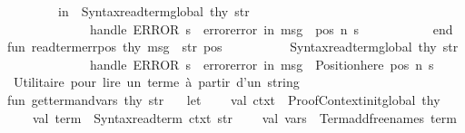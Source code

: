\begin{isabellebody}
\ \ \ \ \ \ \ \ in\ \ {\isacharparenleft}{\kern0pt}Syntax{\isachardot}{\kern0pt}read{\isacharunderscore}{\kern0pt}term{\isacharunderscore}{\kern0pt}global\ thy\ str\isanewline
\ \ \ \ \ \ \ \ \ \ \ \ \ handle\ ERROR\ s\ {\isacharequal}{\kern0pt}{\isachargreater}{\kern0pt}\ error{\isacharparenleft}{\kern0pt}{\isachardoublequote}{\kern0pt}error\ in\ {\isachardoublequote}{\kern0pt}{\isacharcircum}{\kern0pt}msg{\isacharcircum}{\kern0pt}{\isachardoublequote}{\kern0pt}\ {\isacharcolon}{\kern0pt}{\isachardoublequote}{\kern0pt}{\isacharcircum}{\kern0pt}\ pos\ {\isacharcircum}{\kern0pt}{\isachardoublequote}{\kern0pt}{\isacharbackslash}{\kern0pt}n{\isachardoublequote}{\kern0pt}{\isacharcircum}{\kern0pt}\ s\ {\isacharparenright}{\kern0pt}\ {\isacharparenright}{\kern0pt}\ \isanewline
\ \ \ \ \ \ \ \ end\isanewline
\isanewline
fun\ read{\isacharunderscore}{\kern0pt}term{\isacharunderscore}{\kern0pt}err{\isacharunderscore}{\kern0pt}pos\ thy\ msg\ {\isacharunderscore}{\kern0pt}\ str\ pos\ {\isacharequal}{\kern0pt}\ \isanewline
\ \ \ \ \ \ \ \ {\isacharparenleft}{\kern0pt}Syntax{\isachardot}{\kern0pt}read{\isacharunderscore}{\kern0pt}term{\isacharunderscore}{\kern0pt}global\ thy\ str\isanewline
\ \ \ \ \ \ \ \ \ \ \ \ \ handle\ ERROR\ s\ {\isacharequal}{\kern0pt}{\isachargreater}{\kern0pt}\ error{\isacharparenleft}{\kern0pt}{\isachardoublequote}{\kern0pt}error\ in\ {\isachardoublequote}{\kern0pt}{\isacharcircum}{\kern0pt}msg{\isacharcircum}{\kern0pt}{\isachardoublequote}{\kern0pt}\ {\isacharcolon}{\kern0pt}{\isachardoublequote}{\kern0pt}{\isacharcircum}{\kern0pt}\ {\isacharparenleft}{\kern0pt}Position{\isachardot}{\kern0pt}here\ pos{\isacharparenright}{\kern0pt}\ {\isacharcircum}{\kern0pt}{\isachardoublequote}{\kern0pt}{\isacharbackslash}{\kern0pt}n{\isachardoublequote}{\kern0pt}{\isacharcircum}{\kern0pt}\ s\ {\isacharparenright}{\kern0pt}\ {\isacharparenright}{\kern0pt}\ \isanewline
\isanewline
{\isacharparenleft}{\kern0pt}{\isacharasterisk}{\kern0pt}\ Utilitaire\ pour\ lire\ un\ terme\ à\ partir\ d’un\ string\ {\isacharasterisk}{\kern0pt}{\isacharparenright}{\kern0pt}\isanewline
fun\ get{\isacharunderscore}{\kern0pt}term{\isacharunderscore}{\kern0pt}and{\isacharunderscore}{\kern0pt}vars\ thy\ str\ {\isacharequal}{\kern0pt}\isanewline
\ \ let\isanewline
\ \ \ \ val\ ctxt\ {\isacharequal}{\kern0pt}\ Proof{\isacharunderscore}{\kern0pt}Context{\isachardot}{\kern0pt}init{\isacharunderscore}{\kern0pt}global\ thy\isanewline
\ \ \ \ val\ term\ {\isacharequal}{\kern0pt}\ Syntax{\isachardot}{\kern0pt}read{\isacharunderscore}{\kern0pt}term\ ctxt\ str\isanewline
\ \ \ \ val\ vars\ {\isacharequal}{\kern0pt}\ Term{\isachardot}{\kern0pt}add{\isacharunderscore}{\kern0pt}free{\isacharunderscore}{\kern0pt}names\ term\ {\isacharbrackleft}{\kern0pt}{\isacharbrackright}{\kern0pt}\isanewline

\end{isabellebody}
